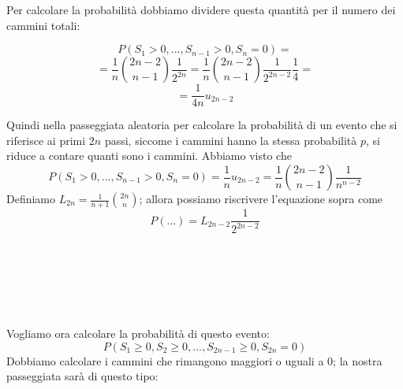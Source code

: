 \documentclass[a4paper,12pt]{book}
\begin{document}
Per calcolare la probabilità dobbiamo dividere questa quantità per il numero dei cammini totali:

$$ P(S_1 > 0, ..., S_{n-1} > 0, S_n = 0) = $$
$$ = \frac{1}{n} \binom{2n-2}{n-1} \frac{1}{2^{2n}} = \frac{1}{n}\binom{2n-2}{n-1}\frac{1}{2^{2n-2}}\frac{1}{4} = $$
$$ = \frac{1}{4n} u_{2n-2} $$

Quindi nella passeggiata aleatoria per calcolare la probabilità di un evento che si riferisce ai primi $ 2n $ passi, siccome i cammini hanno la stessa probabilità $ p $,
 si riduce a contare quanti sono i cammini. Abbiamo visto che 
 $$ P (S_1 > 0, ..., S_{n-1} > 0, S_n = 0) = \frac{1}{n} u_{2n-2} = \frac{1}{n}\binom{2n-2}{n-1} \frac{1}{n^{n-2}}$$
 Definiamo $ L_{2n} = \frac{1}{n+1}\binom{2n}{n} $; allora possiamo riscrivere l'equazione sopra come
 $$ P(...) = L_{2n-2} \frac{1}{2^{2n-2}} $$
\\
\\
\\
\\
\\
\\
Vogliamo ora calcolare la probabilità di questo evento:
$$ P(S_1 \ge 0, S_2 \ge 0, ..., S_{2n-1} \ge 0, S_{2n} = 0) $$
Dobbiamo calcolare i cammini che rimangono maggiori o uguali a 0; la nostra passeggiata sarà di questo tipo:

\begin{center}
\end{center}
\end{document}
